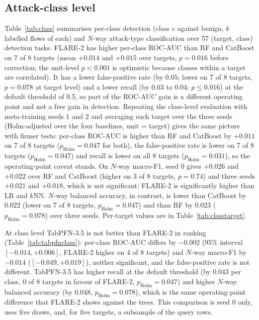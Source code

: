 \documentclass[11pt]{article}
\begin{document}
\subsection{Attack-class level}
Table~\ref{tab:class} summarises per-class detection (class $c$ against benign, $k$ labelled flows of each) and $N$-way attack-type classification over 57 (target, class) detection tasks.
FLARE-2 has higher per-class ROC-AUC than RF and CatBoost on 7 of 8 targets (mean $+0.014$ and $+0.015$ over targets, $p=0.016$ before correction; the unit-level $p<0.001$ is optimistic because classes within a target are correlated).
It has a lower false-positive rate (by $0.05$; lower on 7 of 8 targets, $p=0.078$ at target level) and a lower recall (by $0.03$ to $0.04$; $p\le0.016$) at the default threshold of 0.5, so part of the ROC-AUC gain is a different operating point and not a free gain in detection.
Repeating the class-level evaluation with meta-training seeds 1 and 2 and averaging each target over the three seeds (Holm-adjusted over the four baselines, unit = target) gives the same picture with firmer tests: per-class ROC-AUC is higher than RF and CatBoost by $+0.011$ on 7 of 8 targets ($p_{\text{Holm}}=0.047$ for both), the false-positive rate is lower on 7 of 8 targets ($p_{\text{Holm}}=0.047$) and recall is lower on all 8 targets ($p_{\text{Holm}}=0.031$), so the operating-point caveat stands.
On $N$-way macro-F1, seed 0 gives $+0.026$ and $+0.022$ over RF and CatBoost (higher on 3 of 8 targets, $p=0.74$) and three seeds $+0.021$ and $+0.018$, which is not significant; FLARE-2 is significantly higher than LR and $k$NN.
$N$-way balanced accuracy, in contrast, is lower than CatBoost by $0.022$ (lower on 7 of 8 targets, $p_{\text{Holm}}=0.047$) and than RF by $0.023$ ($p_{\text{Holm}}=0.078$) over three seeds.
Per-target values are in Table~\ref{tab:classtarget}.

At class level TabPFN-3.5 is not better than FLARE-2 in ranking (Table~\ref{tab:tabpfnclass}): per-class ROC-AUC differs by $-0.002$ (95\% interval $[-0.014,+0.006]$, FLARE-2 higher on 4 of 8 targets) and $N$-way macro-F1 by $-0.014$ ($[-0.049,+0.019]$), neither significant, and the false-positive rate is not different.
TabPFN-3.5 has higher recall at the default threshold (by $0.043$ per class, 0 of 8 targets in favour of FLARE-2, $p_{\text{Holm}}=0.047$) and higher $N$-way balanced accuracy (by $0.048$, $p_{\text{Holm}}=0.078$), which is the same operating-point difference that FLARE-2 shows against the trees.
This comparison is seed 0 only, uses five draws, and, for five targets, a subsample of the query rows.
\end{document}
